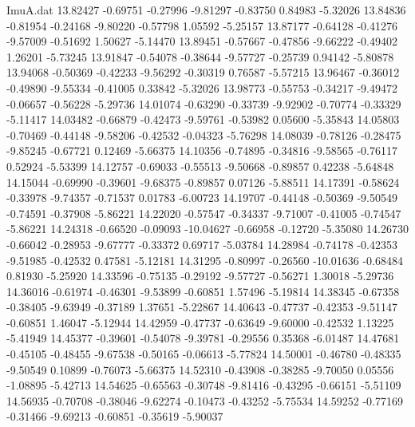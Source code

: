 \begin{filecontents}{ImuA.dat}
  13.82427   -0.69751   -0.27996   -9.81297   -0.83750    0.84983   -5.32026
  13.84836   -0.81954   -0.24168   -9.80220   -0.57798    1.05592   -5.25157
  13.87177   -0.64128   -0.41276   -9.57009   -0.51692    1.50627   -5.14470
  13.89451   -0.57667   -0.47856   -9.66222   -0.49402    1.26201   -5.73245
  13.91847   -0.54078   -0.38644   -9.57727   -0.25739    0.94142   -5.80878
  13.94068   -0.50369   -0.42233   -9.56292   -0.30319    0.76587   -5.57215
  13.96467   -0.36012   -0.49890   -9.55334   -0.41005    0.33842   -5.32026
  13.98773   -0.55753   -0.34217   -9.49472   -0.06657   -0.56228   -5.29736
  14.01074   -0.63290   -0.33739   -9.92902   -0.70774   -0.33329   -5.11417
  14.03482   -0.66879   -0.42473   -9.59761   -0.53982    0.05600   -5.35843
  14.05803   -0.70469   -0.44148   -9.58206   -0.42532   -0.04323   -5.76298
  14.08039   -0.78126   -0.28475   -9.85245   -0.67721    0.12469   -5.66375
  14.10356   -0.74895   -0.34816   -9.58565   -0.76117    0.52924   -5.53399
  14.12757   -0.69033   -0.55513   -9.50668   -0.89857    0.42238   -5.64848
  14.15044   -0.69990   -0.39601   -9.68375   -0.89857    0.07126   -5.88511
  14.17391   -0.58624   -0.33978   -9.74357   -0.71537    0.01783   -6.00723
  14.19707   -0.44148   -0.50369   -9.50549   -0.74591   -0.37908   -5.86221
  14.22020   -0.57547   -0.34337   -9.71007   -0.41005   -0.74547   -5.86221
  14.24318   -0.66520   -0.09093  -10.04627   -0.66958   -0.12720   -5.35080
  14.26730   -0.66042   -0.28953   -9.67777   -0.33372    0.69717   -5.03784
  14.28984   -0.74178   -0.42353   -9.51985   -0.42532    0.47581   -5.12181
  14.31295   -0.80997   -0.26560  -10.01636   -0.68484    0.81930   -5.25920
  14.33596   -0.75135   -0.29192   -9.57727   -0.56271    1.30018   -5.29736
  14.36016   -0.61974   -0.46301   -9.53899   -0.60851    1.57496   -5.19814
  14.38345   -0.67358   -0.38405   -9.63949   -0.37189    1.37651   -5.22867
  14.40643   -0.47737   -0.42353   -9.51147   -0.60851    1.46047   -5.12944
  14.42959   -0.47737   -0.63649   -9.60000   -0.42532    1.13225   -5.41949
  14.45377   -0.39601   -0.54078   -9.39781   -0.29556    0.35368   -6.01487
  14.47681   -0.45105   -0.48455   -9.67538   -0.50165   -0.06613   -5.77824
  14.50001   -0.46780   -0.48335   -9.50549    0.10899   -0.76073   -5.66375
  14.52310   -0.43908   -0.38285   -9.70050    0.05556   -1.08895   -5.42713
  14.54625   -0.65563   -0.30748   -9.81416   -0.43295   -0.66151   -5.51109
  14.56935   -0.70708   -0.38046   -9.62274   -0.10473   -0.43252   -5.75534
  14.59252   -0.77169   -0.31466   -9.69213   -0.60851   -0.35619   -5.90037

\end{filecontents}
